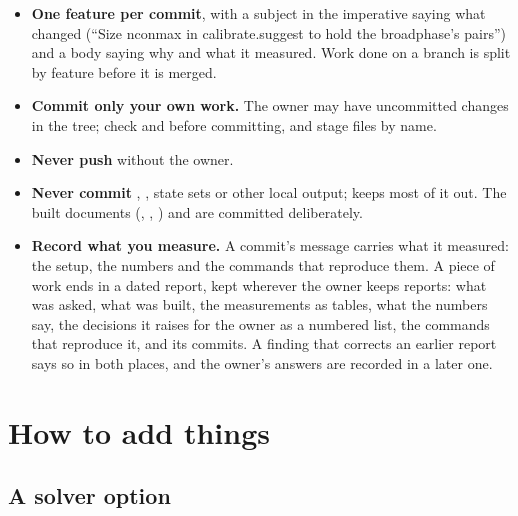 \begin{itemize}
\item \textbf{One feature per commit}, with a subject in the imperative saying what changed (``Size nconmax in calibrate.suggest to hold the broadphase's pairs'') and a body saying why and what it measured. Work done on a branch is split by feature before it is merged.
\item \textbf{Commit only your own work.} The owner may have uncommitted changes in the tree; check  and  before committing, and stage files by name.
\item \textbf{Never push} without the owner.
\item \textbf{Never commit} , , state sets or other local output;  keeps most of it out. The built documents (, , ) and  are committed deliberately.
\item \textbf{Record what you measure.} A commit's message carries what it measured: the setup, the numbers and the commands that reproduce them. A piece of work ends in a dated report, kept wherever the owner keeps reports: what was asked, what was built, the measurements as tables, what the numbers say, the decisions it raises for the owner as a numbered list, the commands that reproduce it, and its commits. A finding that corrects an earlier report says so in both places, and the owner's answers are recorded in a later one.
\end{itemize}

\section{How to add things}\label{sec:add}

\subsection{A solver option}\label{sec:addoption}

